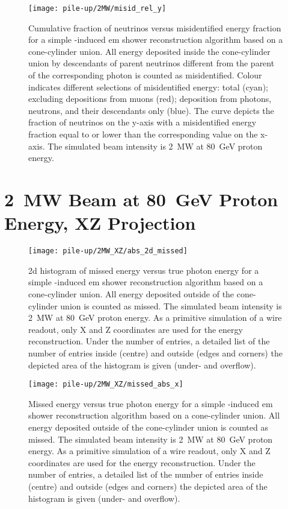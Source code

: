 \begin{figure}[htb]
	\centering
	\texttt{[image: pile-up/2MW/misid\_rel\_y]}
	\caption{Cumulative fraction of neutrinos versus misidentified energy fraction for a simple \Pgpz-induced \gls{em} shower reconstruction algorithm based on a cone-cylinder union.
		All energy deposited inside the cone-cylinder union by descendants of parent neutrinos different from the parent of the corresponding \Pgpz photon is counted as misidentified.
		Colour indicates different selections of misidentified energy: total (cyan); excluding depositions from muons (red); deposition from photons, neutrons, and their descendants only (blue).
		The curve depicts the fraction of neutrinos on the y-axis with a misidentified energy fraction equal to or lower than the corresponding value on the x-axis.
		The simulated beam intensity is \SI{2}{\mega\watt} at \SI{80}{\giga\electronvolt} proton energy.}
\end{figure}


\section{\SI{2}{\mega\watt} Beam at \SI{80}{\giga\electronvolt} Proton Energy, XZ Projection}

\begin{figure}[htb]
	\centering
	\texttt{[image: pile-up/2MW\_XZ/abs\_2d\_missed]}
	\caption{\gls{2d} histogram of missed energy versus true photon energy for a simple \Pgpz-induced \gls{em} shower reconstruction algorithm based on a cone-cylinder union.
		All energy deposited outside of the cone-cylinder union is counted as missed.
		The simulated beam intensity is \SI{2}{\mega\watt} at \SI{80}{\giga\electronvolt} proton energy.
		As a primitive simulation of a wire readout, only X and Z coordinates are used for the energy reconstruction.
		Under the number of entries, a detailed list of the number of entries inside (centre) and outside (edges and corners) the depicted area of the histogram is given (under- and overflow).}
\end{figure}

\begin{figure}[htb]
	\centering
	\texttt{[image: pile-up/2MW\_XZ/missed\_abs\_x]}
	\caption{Missed energy versus true photon energy for a simple \Pgpz-induced \gls{em} shower reconstruction algorithm based on a cone-cylinder union.
		All energy deposited outside of the cone-cylinder union is counted as missed.
		The simulated beam intensity is \SI{2}{\mega\watt} at \SI{80}{\giga\electronvolt} proton energy.
		As a primitive simulation of a wire readout, only X and Z coordinates are used for the energy reconstruction.
		Under the number of entries, a detailed list of the number of entries inside (centre) and outside (edges and corners) the depicted area of the histogram is given (under- and overflow).}
\end{figure}

